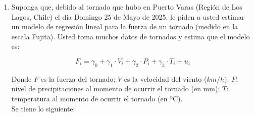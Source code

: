 \documentclass[10pt,a4paper]{article}
\begin{document}
\begin{enumerate}
\begin{enumerate}
    \item (9 puntos) Determine los errores estándar de $\hat{\beta}_0$, $\hat{\beta}_1$ y $\hat{\beta}_2$.
\item (11 puntos) Plantee la hip\'otesis  que testea $\beta_2$ es el doble de  $\beta_1$. 
¿Se puede rechazar la hipótesis nula con la información que disponemos con una significancia del 1\%?
    \end{enumerate}
      \item     Suponga que, debido al tornado que hubo en Puerto Varas (Región de Los Lagos, Chile) el día Domingo 25 de Mayo de 2025, le piden a usted estimar un modelo de regresión lineal  para la fuerza de un tornado (medido en la escala Fujita). Usted toma muchos datos de tornados y estima que el modelo es:

    $$F_i = \gamma_0 + \gamma_1 \cdot V_i + \gamma_2 \cdot P_i + \gamma_3 \cdot T_i + u_i$$

    Donde $F$ es la fuerza del tornado; $V$ es la velocidad del viento ($km/h$); $P$: nivel de precipitaciones al momento de ocurrir el tornado (en mm); $T$: temperatura al momento de ocurrir el tornado (en ºC).\\

    Se tiene lo siguiente:


\end{enumerate}
\end{document}
